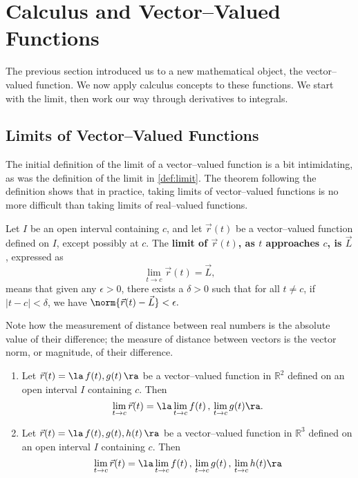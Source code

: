 \section{Calculus and Vector--Valued Functions}\label{sec:vvf_calc}

The previous section introduced us to a new mathematical object, the vector--valued function. We now apply calculus concepts to these functions. We start with the limit, then work our way through derivatives to integrals.

\subsection*{Limits of Vector--Valued Functions}

The initial definition of the limit of a vector--valued function is a bit intimidating, as was the definition of the limit in \autoref{def:limit}. The theorem following the definition shows that in practice, taking limits of vector--valued functions is no more difficult than taking limits of real--valued functions.

{Let $I$ be an open interval containing $c$, and let $\vec r(t)$ be a vector--valued function defined on $I$, except possibly at $c$. %
The \textbf{limit of $\vec r(t)$, as $t$ approaches $c$, is $\vec L$}, expressed as 
$$\lim_{t\to c} \vec r(t) = \vec L,$$ means that given any $\epsilon>0$, there exists a $\delta>0$ such that for all $t\neq c$, if $|t-c| <\delta$, we have $\norm{\vec r(t) - \vec L} < \epsilon.$
}

Note how the measurement of distance between real numbers is the absolute value of their difference; the measure of distance between vectors is the vector norm, or magnitude, of their difference.

{\begin{enumerate}
	\item Let $\vec r(t) = \la \,f(t),g(t)\,\ra$ be a vector--valued function in $\mathbb{R}^2$ defined on an open interval $I$ containing $c$. Then
	$$\lim_{t\to c} \vec r(t) = \la \lim_{t\to c}f(t)\, , \,\lim_{t\to c} g(t)\ra.$$
	\item Let $\vec r(t) = \la \,f(t),g(t),h(t)\,\ra$ be a vector--valued function in $\mathbb{R}^3$ defined on an open interval $I$ containing $c$. Then 
	$$\lim_{t\to c} \vec r(t) = \la \lim_{t\to c}f(t)\, , \,\lim_{t\to c} g(t)\,, \,\lim_{t\to c} h(t)\ra$$
\end{enumerate}}

